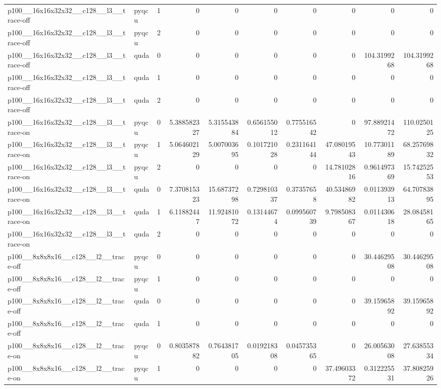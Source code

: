 \begin{table}[htbp]
\begin{tabular}{@{}llrrrrrrrr@{}}
p100\_\_16x16x32x32\_\_c128\_\_l3\_\_trace-off & pyqcu & 1 & 0 & 0 & 0 & 0 & 0 & 0 & 0 \\
p100\_\_16x16x32x32\_\_c128\_\_l3\_\_trace-off & pyqcu & 2 & 0 & 0 & 0 & 0 & 0 & 0 & 0 \\
p100\_\_16x16x32x32\_\_c128\_\_l3\_\_trace-off & quda & 0 & 0 & 0 & 0 & 0 & 0 & 104.3199268 & 104.3199268 \\
p100\_\_16x16x32x32\_\_c128\_\_l3\_\_trace-off & quda & 1 & 0 & 0 & 0 & 0 & 0 & 0 & 0 \\
p100\_\_16x16x32x32\_\_c128\_\_l3\_\_trace-off & quda & 2 & 0 & 0 & 0 & 0 & 0 & 0 & 0 \\
p100\_\_16x16x32x32\_\_c128\_\_l3\_\_trace-on & pyqcu & 0 & 5.388582327 & 5.315543884 & 0.656155012 & 0.775516542 & 0 & 97.88921472 & 110.0250125 \\
p100\_\_16x16x32x32\_\_c128\_\_l3\_\_trace-on & pyqcu & 1 & 5.064602129 & 5.007003695 & 0.101721028 & 0.231164144 & 47.08019543 & 10.77301189 & 68.25769832 \\
p100\_\_16x16x32x32\_\_c128\_\_l3\_\_trace-on & pyqcu & 2 & 0 & 0 & 0 & 0 & 14.78102816 & 0.961497369 & 15.74252553 \\
p100\_\_16x16x32x32\_\_c128\_\_l3\_\_trace-on & quda & 0 & 7.370815323 & 15.68737298 & 0.729810337 & 0.37357658 & 40.53486982 & 0.011393913 & 64.70783895 \\
p100\_\_16x16x32x32\_\_c128\_\_l3\_\_trace-on & quda & 1 & 6.11882447 & 11.92481072 & 0.13144674 & 0.099560739 & 9.798508367 & 0.011430618 & 28.08458165 \\
p100\_\_16x16x32x32\_\_c128\_\_l3\_\_trace-on & quda & 2 & 0 & 0 & 0 & 0 & 0 & 0 & 0 \\
p100\_\_8x8x8x16\_\_c128\_\_l2\_\_trace-off & pyqcu & 0 & 0 & 0 & 0 & 0 & 0 & 30.44629508 & 30.44629508 \\
p100\_\_8x8x8x16\_\_c128\_\_l2\_\_trace-off & pyqcu & 1 & 0 & 0 & 0 & 0 & 0 & 0 & 0 \\
p100\_\_8x8x8x16\_\_c128\_\_l2\_\_trace-off & quda & 0 & 0 & 0 & 0 & 0 & 0 & 39.15965892 & 39.15965892 \\
p100\_\_8x8x8x16\_\_c128\_\_l2\_\_trace-off & quda & 1 & 0 & 0 & 0 & 0 & 0 & 0 & 0 \\
p100\_\_8x8x8x16\_\_c128\_\_l2\_\_trace-on & pyqcu & 0 & 0.803587882 & 0.764381705 & 0.019218308 & 0.045735365 & 0 & 26.00563008 & 27.63855334 \\
p100\_\_8x8x8x16\_\_c128\_\_l2\_\_trace-on & pyqcu & 1 & 0 & 0 & 0 & 0 & 37.49603372 & 0.312225531 & 37.80825926 \\

\end{tabular}
\end{table}
